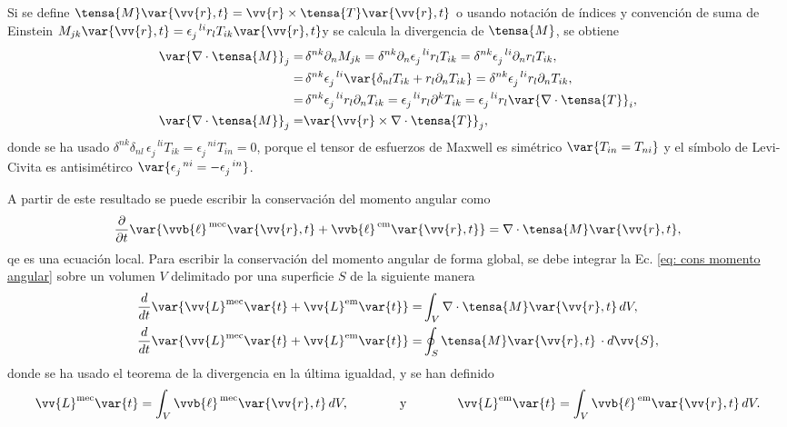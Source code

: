 Si se define $\tensa{M}\var{\vv{r},t}=\vv{r}\times\tensa{T}\var{\vv{r},t}$ \textemdash o usando notación de índices y convención de suma de Einstein $M_{jk}\var{\vv{r},t}=\epsilon_{j}^{\,\,\,\, li} r_l T_{ik}\var{\vv{r},t}$\textemdash y se calcula la divergencia de $\tensa{M}$, se obtiene 
\begin{align}
\var{\nabla\cdot\tensa{M}}_{j} =& \,\delta^{nk} \partial_n M_{jk} = \delta^{nk} \partial_n \epsilon_{j}^{\,\,\,\, li} r_l T_{ik} =\delta^{nk}\epsilon_{j}^{\,\,\,\, li}\partial_n r_l T_{ik}, \nonumber \\
								=& \,\delta^{nk}\epsilon_{j}^{\,\,\,\, li}\var{\delta_{nl} T_{ik} + r_l \partial_n T_{ik}} =\delta^{nk}\epsilon_{j}^{\,\,\,\, li}r_l\partial_n T_{ik}, \nonumber \\
								=& \,\delta^{nk} \epsilon_{j}^{\,\,\,\, li} r_l \partial_n T_{ik} = \epsilon_{j}^{\,\,\,\, li} r_l \partial^k T_{ik} = \epsilon_{j}^{\,\,\,\, li} r_l \var{\nabla\cdot\tensa{T}}_i, \nonumber \\
\var{\nabla\cdot\tensa{M}}_{j} =& \var{\vv{r}\times \nabla\cdot\tensa{T}}_j,
\end{align}
donde se ha usado $\delta^{nk}\delta_{nl}\,\epsilon_{j}^{\,\,\,\, li}T_{ik} = \epsilon_{j}^{\,\,\,\, ni}T_{in} = 0$, porque el tensor de esfuerzos de Maxwell es simétrico $\var{T_{in}=T_{ni}}$ y el símbolo de Levi-Civita es antisimétirco $\var{\epsilon_{j}^{\,\,\,\, ni}=-\epsilon_{j}^{\,\,\,\, in}}$.

A partir de este resultado se puede escribir la conservación del momento angular como
\begin{equation}
\frac{\partial}{\partial t} \var{\vvb{\ell}^{\rm \, mec}\var{\vv{r},t}+\vvb{\ell}^{\rm \, em}\var{\vv{r},t}} = \nabla \cdot \tensa{M}\var{\vv{r},t},
\label{eq: cons momento angular}
\end{equation}
qe es una ecuación local. Para escribir la conservación del momento angular de forma global, se debe integrar la Ec. \eqref{eq: cons momento angular} sobre un volumen $V$ delimitado por una superficie $S$ de la siguiente manera
\begin{align}
\frac{d}{dt}\var{\vv{L}^{\rm mec}\var{t}+\vv{L}^{\rm em}\var{t}} =& \int_V \nabla\cdot\tensa{M}\var{\vv{r},t} \, dV, \nonumber \\
\frac{d}{dt}\var{\vv{L}^{\rm mec}\var{t}+\vv{L}^{\rm em}\var{t}} =& \oint_S \tensa{M}\var{\vv{r},t} \, \cdot d\vv{S},
\label{eq: cons momento angular global}
\end{align}
donde se ha usado el teorema de la divergencia en la última igualdad, y se han definido 
\begin{equation}
\vv{L}^{\rm mec}\var{t} = \int_V \vvb{\ell}^{\, \rm mec}\var{\vv{r},t}\, dV, \qquad\qquad \text{y} \qquad\qquad \vv{L}^{\rm em}\var{t} = \int_V \vvb{\ell}^{\, \rm em}\var{\vv{r},t}\, dV.
\end{equation}

